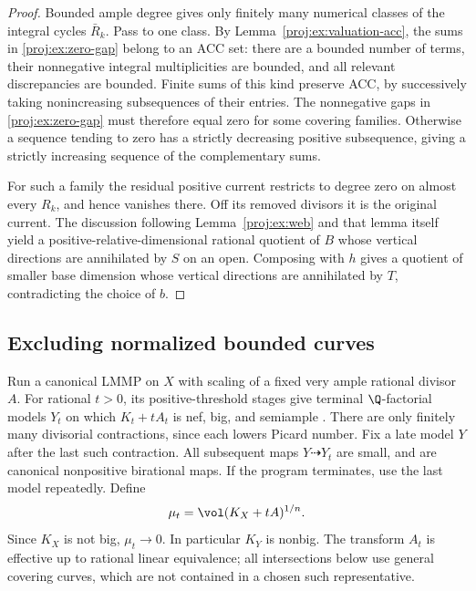 \begin{proof}
Bounded ample degree gives only finitely many numerical
classes of the integral cycles \(\bar R_k\). Pass to one
class. By Lemma~\ref{proj:ex:valuation-acc}, the sums in
\eqref{proj:ex:zero-gap} belong to an ACC set: there are a bounded
number of terms, their nonnegative integral multiplicities
are bounded, and all relevant discrepancies are bounded.
Finite sums of this kind preserve ACC, by successively
taking nonincreasing subsequences of their entries.
The nonnegative gaps in \eqref{proj:ex:zero-gap} must therefore
equal zero for some covering families. Otherwise a sequence
tending to zero has a strictly decreasing positive
subsequence, giving a strictly increasing sequence of the
complementary sums.

For such a family the residual positive current restricts
to degree zero on almost every \(R_k\), and hence vanishes
there. Off its removed divisors it is the original current.
The discussion following Lemma~\ref{proj:ex:web} and that lemma
itself yield a positive-relative-dimensional rational
quotient of \(B\) whose vertical directions are annihilated
by \(S\) on an open. Composing with \(h\) gives a quotient
of smaller base dimension whose vertical directions are
annihilated by \(T\), contradicting the choice of \(b\).
\end{proof}

\subsection{Excluding normalized bounded curves}

Run a canonical LMMP on \(X\) with scaling of a fixed very ample
rational divisor \(A\). For rational \(t>0\), its positive-threshold
stages give terminal \(\Q\)-factorial models \(Y_t\) on which
\(K_t+tA_t\) is nef, big, and semiample
\cite{BCHM}. There are only finitely many divisorial
contractions, since each lowers Picard number. Fix a late model
\(Y\) after the last such contraction. All subsequent maps
\(Y\dashrightarrow Y_t\) are small, and are canonical
nonpositive birational maps. If the program terminates, use
the last model repeatedly. Define
\begin{equation}\label{proj:ex:volume-scale}
 \mu_t=\vol(K_X+tA)^{1/n}.
\end{equation}
Since \(K_X\) is not big, \(\mu_t\to0\). In particular \(K_Y\)
is nonbig. The transform \(A_t\) is effective up to rational
linear equivalence; all intersections below use general
covering curves, which are not contained in a chosen such
representative.

